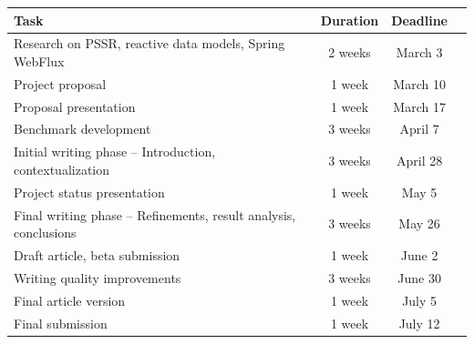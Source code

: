 \documentclass[a4paper,twoside,11pt]{article}
\begin{document}
\begin{table}[h]
  \centering
  \renewcommand{\arraystretch}{1.3}
  \begin{tabular}{|p{8cm}|c|c|p{6cm}|}
      \hline
      \textbf{Task} & \textbf{Duration} & \textbf{Deadline} \\
      \hline
      Research on PSSR, reactive data models, Spring WebFlux & 2 weeks & March 3 \\
      \hline
      Project proposal & 1 week & March 10 \\
      \hline
      Proposal presentation & 1 week & March 17 \\
      \hline
      Benchmark development & 3 weeks & April 7 \\
      \hline
      Initial writing phase – Introduction, contextualization & 3 weeks & April 28 \\
      \hline
      Project status presentation & 1 week & May 5 \\
      \hline
      Final writing phase – Refinements, result analysis, conclusions & 3 weeks & May 26 \\
      \hline
      Draft article, beta submission & 1 week & June 2 \\
      \hline
      Writing quality improvements & 3 weeks & June 30 \\
      \hline
      Final article version & 1 week & July 5 \\
      \hline
      Final submission & 1 week & July 12 \\
      \hline
  \end{tabular}
  \label{tab:planning}
\end{table}



\end{document}
